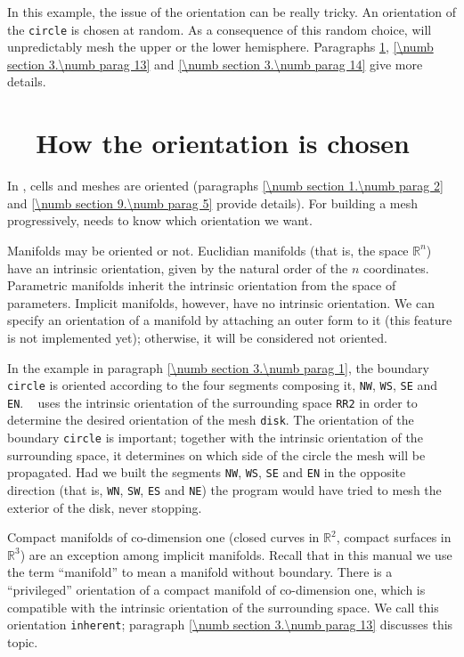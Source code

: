 In this example, the issue of the orientation can be really tricky.
An orientation of the {\small\tt circle} is chosen at random.
As a consequence of this random choice, {\maniFEM} will unpredictably mesh the upper or
the lower hemisphere.
Paragraphs \ref{\numb section 3.\numb parag 10}, \ref{\numb section 3.\numb parag 13} and
\ref{\numb section 3.\numb parag 14} give more details.


\section{~~How the orientation is chosen}\label{\numb section 3.\numb parag 10}

In \maniFEM, cells and meshes are oriented (paragraphs \ref{\numb section 1.\numb parag 2}
and \ref{\numb section 9.\numb parag 5} provide details).
For building a mesh progressively, {\maniFEM} needs to know which orientation we want.

Manifolds may be oriented or not.
Euclidian manifolds (that is, the space $ \mathbb{R}^n $) have an intrinsic orientation,
given by the natural order of the $n$ coordinates.
Parametric manifolds inherit the intrinsic orientation from the space of parameters.
Implicit manifolds, however, have no intrinsic orientation.
We can specify an orientation of a manifold by attaching an outer form to it
(this feature is not implemented yet); otherwise, it will be considered not oriented.

In the example in paragraph \ref{\numb section 3.\numb parag 1}, the boundary {\small\tt circle}
is oriented according to the four segments composing it, {\small\tt NW}, {\small\tt WS},
{\small\tt SE} and {\small\tt EN}.
\ {\ManiFEM} uses the intrinsic orientation of the surrounding space {\small\tt RR2} in order
to determine the desired orientation of the mesh {\small\tt disk}.
The orientation of the boundary {\small\tt circle} is important;
together with the intrinsic orientation of the surrounding space,
it determines on which side of the circle the mesh will be propagated.
Had we built the segments {\small\tt NW}, {\small\tt WS}, {\small\tt SE} and {\small\tt EN} in the
opposite direction (that is, {\small\tt WN}, {\small\tt SW}, {\small\tt ES} and {\small\tt NE})
the program would have tried to mesh the exterior of the disk, never stopping.

Compact manifolds of co-dimension one (closed curves in $ \mathbb{R}^2 $,
compact surfaces in $ \mathbb{R}^3 $) are an exception among implicit manifolds.
Recall that in this manual we use the term ``manifold'' to mean a manifold without boundary.
There is a ``privileged'' orientation of a compact manifold of co-dimension one,
which is compatible with the intrinsic orientation of the surrounding space.
We call this orientation {\small\tt inherent}; paragraph \ref{\numb section 3.\numb parag 13}
discusses this topic.

